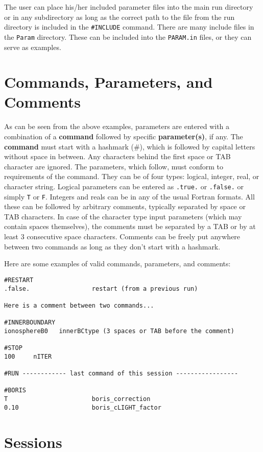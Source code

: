 The user can place his/her
included parameter files into the main run directory or in any subdirectory
as long as the correct path to the file from the run directory is
included in the {\tt \#INCLUDE} command.
There are many include files in the {\tt Param} directory. These
can be included into the {\tt PARAM.in} files, or they can serve as
examples. 

\section{Commands, Parameters, and Comments \label{section:commands}}

As can be seen from the above examples,  parameters are entered
with a combination of a {\bf command} followed by specific {\bf parameter(s)},
if any.
The {\bf command} must start with a hashmark (\#), which is followed by capital 
letters without space in between. Any characters behind the first 
space or TAB character are ignored. The parameters, which follow, must conform to 
requirements of the command. They can be of four types: logical, integer,
real, or character string. Logical parameters can be entered as 
{\tt .true.} or {\tt .false.} or simply {\tt T} or {\tt F}.
Integers and reals can be in any of the usual Fortran formats.
All these can be followed by arbitrary comments, typically separated
by space or TAB characters. In case of the character type input
parameters (which may contain spaces themselves), the comments must
be separated by a TAB or by at least 3 consecutive space characters.
Comments can be freely put anywhere between two commands as long
as they don't start with a hashmark.

Here are some examples of valid commands, parameters, and comments:
\begin{verbatim}
#RESTART
.false.                 restart (from a previous run)

Here is a comment between two commands...

#INNERBOUNDARY
ionosphereB0   innerBCtype (3 spaces or TAB before the comment)

#STOP
100		nITER

#RUN ------------ last command of this session -----------------

#BORIS
T                       boris_correction
0.10                    boris_cLIGHT_factor

\end{verbatim}

\section{Sessions \label{section:sessions}}

